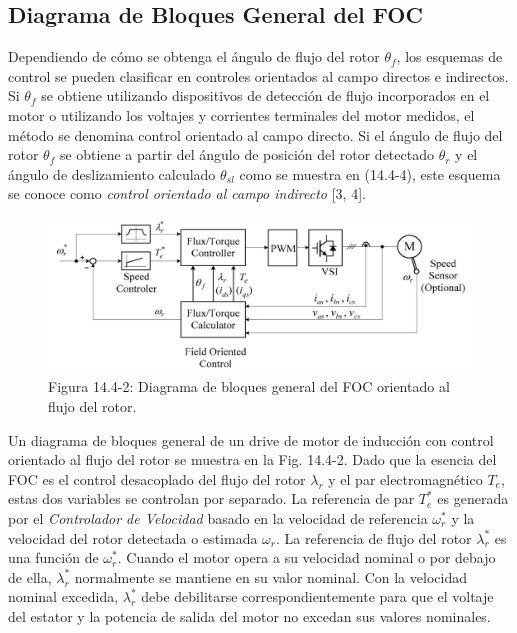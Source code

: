 \documentclass[letterpaper,12pt]{article}
\begin{document}
\subsection{Diagrama de Bloques General del FOC}

Dependiendo de cómo se obtenga el ángulo de flujo del rotor $\theta_f$, los esquemas de control se pueden clasificar en controles orientados al campo directos e indirectos. Si $\theta_f$ se obtiene utilizando dispositivos de detección de flujo incorporados en el motor o utilizando los voltajes y corrientes terminales del motor medidos, el método se denomina control orientado al campo directo. Si el ángulo de flujo del rotor $\theta_f$ se obtiene a partir del ángulo de posición del rotor detectado $\theta_r$ y el ángulo de deslizamiento calculado $\theta_{sl}$ como se muestra en (14.4-4), este esquema se conoce como \textit{control orientado al campo indirecto} [3, 4].

\begin{figure}[ht]
\centering
\includegraphics{graficos/img12.jpg}
\caption{Figura 14.4-2: Diagrama de bloques general del FOC orientado al flujo del rotor.}
\end{figure}
\FloatBarrier

Un diagrama de bloques general de un drive de motor de inducción con control orientado al flujo del rotor se muestra en la Fig. 14.4-2. Dado que la esencia del FOC es el control desacoplado del flujo del rotor $\lambda_r$ y el par electromagnético $T_e$, estas dos variables se controlan por separado. La referencia de par $T_e^*$ es generada por el \textit{Controlador de Velocidad} basado en la velocidad de referencia $\omega_r^*$ y la velocidad del rotor detectada o estimada $\omega_r$. La referencia de flujo del rotor $\lambda_r^*$ es una función de $\omega_r^*$. Cuando el motor opera a su velocidad nominal o por debajo de ella, $\lambda_r^*$ normalmente se mantiene en su valor nominal. Con la velocidad nominal excedida, $\lambda_r^*$ debe debilitarse correspondientemente para que el voltaje del estator y la potencia de salida del motor no excedan sus valores nominales.
\end{document}
